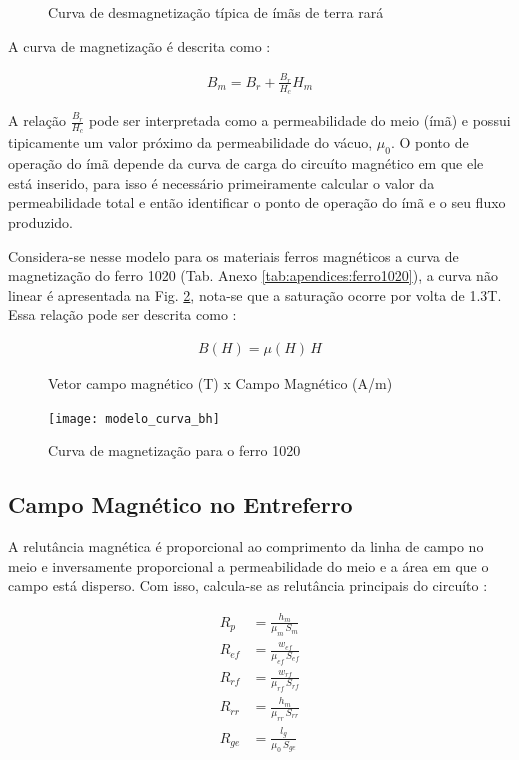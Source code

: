 \begin{figure}[!ht]
	\centering
	\def\svgwidth{0.7\columnwidth}
	
	\caption{Curva de desmagnetização típica de ímãs de terra rará}
	\label{Fig:Modelagem:circuito:passivo:ima}
\end{figure}

A curva de magnetização é descrita como :

\begin{align}
B_m = B_r + \frac{B_r}{H_c} H_m
\label{eq:p:ima}
\end{align}

A relação $\frac{B_r}{H_c}$ pode ser interpretada como a permeabilidade do meio (ímã) e possui tipicamente um valor próximo da permeabilidade do vácuo, $\mu_0$. O ponto de operação do ímã depende da curva de carga do circuíto magnético em que ele está inserido, para isso é necessário primeiramente calcular o valor da permeabilidade total e então identificar o ponto de operação do ímã e o seu fluxo produzido.

Considera-se nesse modelo para os materiais ferros magnéticos a curva de magnetização do ferro 1020 (Tab. Anexo \ref{tab:apendices:ferro1020}), a curva não linear é apresentada na Fig. \ref{Fig:Modelagem:BH}, nota-se que a saturação ocorre por volta de 1.3T. Essa relação pode ser descrita como :

\begin{align}
B(H) = \mu(H) \, H
\label{eq:p:BH:ferro}
\end{align}

\begin{figure}[!ht]
	\centering
	\caption*{ Vetor campo magnético (T) x Campo Magnético (A/m)}
	\texttt{[image: modelo\_curva\_bh]}
	\caption{Curva de magnetização para o ferro 1020}
	\label{Fig:Modelagem:BH}
\end{figure}


\subsection{Campo Magnético no Entreferro}

A relutância magnética é proporcional ao comprimento da linha de campo no meio e inversamente proporcional a permeabilidade do meio e a área em que o campo está disperso. Com isso, calcula-se as relutância principais do circuíto :

\begin{align}
R_{p}  &= \frac{h_m}{\mu_m \, S_m}			\\
R_{ef} &= \frac{w_{ef}}{\mu_{ef}\, S_{ef}}  \\     
R_{rf} &= \frac{w_{rf}}{\mu_{rf}\, S_{rf}}   \\    
R_{rr} &= \frac{h_m}{\mu_{rr} \, S_{rr}}     \\      
R_{ge} &= \frac{l_g}{\mu_0  \, S_{ge}}        
\end{align}


